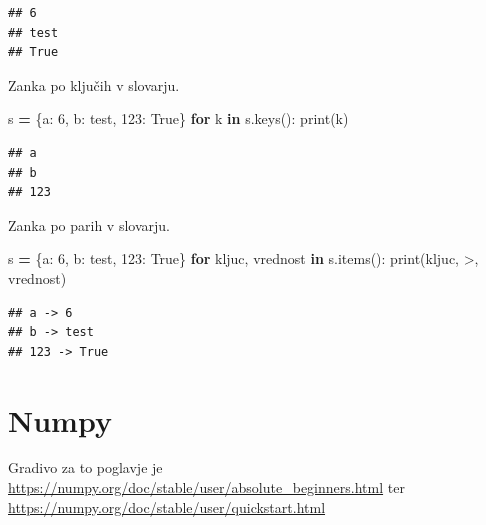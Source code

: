 \documentclass[
]{book}
\newenvironment{Shaded}{\begin{snugshade}}{\end{snugshade}}
\newcommand{\BuiltInTok}[1]{#1}
\newcommand{\ControlFlowTok}[1]{\textcolor[rgb]{0.13,0.29,0.53}{\textbf{#1}}}
\newcommand{\DecValTok}[1]{\textcolor[rgb]{0.00,0.00,0.81}{#1}}
\newcommand{\KeywordTok}[1]{\textcolor[rgb]{0.13,0.29,0.53}{\textbf{#1}}}
\newcommand{\NormalTok}[1]{#1}
\newcommand{\OperatorTok}[1]{\textcolor[rgb]{0.81,0.36,0.00}{\textbf{#1}}}
\newcommand{\StringTok}[1]{\textcolor[rgb]{0.31,0.60,0.02}{#1}}
\newcommand{\VariableTok}[1]{\textcolor[rgb]{0.00,0.00,0.00}{#1}}
\begin{document}
\begin{verbatim}
## 6
## test
## True
\end{verbatim}

Zanka po ključih v slovarju.

\begin{Shaded}
\begin{Highlighting}[]
\NormalTok{s }\OperatorTok{=}\NormalTok{ \{}\StringTok{\textquotesingle{}a\textquotesingle{}}\NormalTok{: }\DecValTok{6}\NormalTok{, }\StringTok{\textquotesingle{}b\textquotesingle{}}\NormalTok{: }\StringTok{\textquotesingle{}test\textquotesingle{}}\NormalTok{, }\DecValTok{123}\NormalTok{: }\VariableTok{True}\NormalTok{\}}
\ControlFlowTok{for}\NormalTok{ k }\KeywordTok{in}\NormalTok{ s.keys():}
    \BuiltInTok{print}\NormalTok{(k)}
\end{Highlighting}
\end{Shaded}

\begin{verbatim}
## a
## b
## 123
\end{verbatim}

Zanka po parih v slovarju.

\begin{Shaded}
\begin{Highlighting}[]
\NormalTok{s }\OperatorTok{=}\NormalTok{ \{}\StringTok{\textquotesingle{}a\textquotesingle{}}\NormalTok{: }\DecValTok{6}\NormalTok{, }\StringTok{\textquotesingle{}b\textquotesingle{}}\NormalTok{: }\StringTok{\textquotesingle{}test\textquotesingle{}}\NormalTok{, }\DecValTok{123}\NormalTok{: }\VariableTok{True}\NormalTok{\}}
\ControlFlowTok{for}\NormalTok{ kljuc, vrednost }\KeywordTok{in}\NormalTok{ s.items():}
    \BuiltInTok{print}\NormalTok{(kljuc, }\StringTok{\textquotesingle{}{-}\textgreater{}\textquotesingle{}}\NormalTok{, vrednost)}
\end{Highlighting}
\end{Shaded}

\begin{verbatim}
## a -> 6
## b -> test
## 123 -> True
\end{verbatim}

\hypertarget{numpy-1}{%
\chapter{Numpy}\label{numpy-1}}

Gradivo za to poglavje je \url{https://numpy.org/doc/stable/user/absolute_beginners.html}
ter \url{https://numpy.org/doc/stable/user/quickstart.html}
\end{document}

